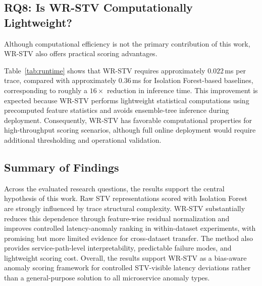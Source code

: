 \subsection{RQ8: Is WR-STV Computationally Lightweight?}

Although computational efficiency is not the primary contribution of
this work, WR-STV also offers practical scoring advantages.

Table~\ref{tab:runtime} shows that WR-STV requires approximately
\(0.022\)\,ms per trace, compared with approximately \(0.36\)\,ms for
Isolation Forest-based baselines, corresponding to roughly a
\(16\times\) reduction in inference time. This improvement is expected
because WR-STV performs lightweight statistical computations using
precomputed feature statistics and avoids ensemble-tree inference during
deployment. Consequently, WR-STV has favorable computational properties
for high-throughput scoring scenarios, although full online deployment
would require additional thresholding and operational validation.

\subsection{Summary of Findings}

Across the evaluated research questions, the results support the central
hypothesis of this work. Raw STV representations scored with Isolation
Forest are strongly influenced by trace structural complexity. WR-STV
substantially reduces this dependence through feature-wise residual
normalization and improves controlled latency-anomaly ranking in
within-dataset experiments, with promising but more limited evidence for
cross-dataset transfer. The method also provides service-path-level
interpretability, predictable failure modes, and lightweight scoring
cost. Overall, the results support WR-STV as a bias-aware anomaly
scoring framework for controlled STV-visible latency deviations rather
than a general-purpose solution to all microservice anomaly types.
